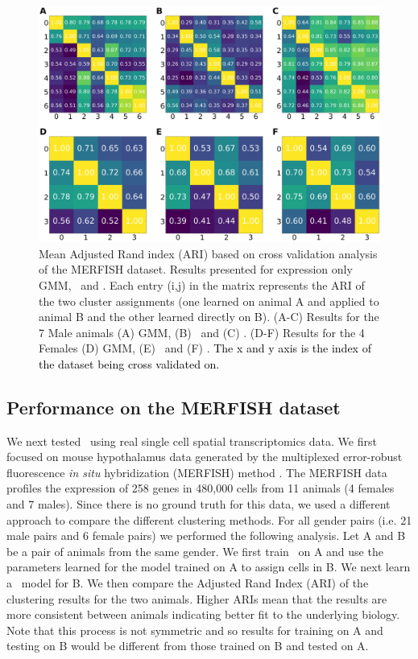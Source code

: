\begin{figure}[h]
    \includegraphics[width=\textwidth]{figs/cv.png}
    \caption{Mean Adjusted Rand index (ARI) based on cross validation analysis of the MERFISH dataset. Results presented for expression only GMM, \smfish\ and \fict. Each entry (i,j) in the matrix represents the ARI of the two cluster assignments (one learned on animal A and applied to animal B and the other learned directly on B). (A-C) Results for the 7 Male animals (A) GMM, (B) \smfish\ and (C) \fict. (D-F) Results for the 4 Females (D) GMM, (E) \smfish\ and (F) \fict. \textcolor{black}{The x and y axis is the index of the dataset being cross validated on.}}
    \label{fig:cv}
\end{figure}
\subsection{Performance on the MERFISH dataset}
We next tested \fict\ using real single cell spatial transcriptomics data. We first focused on mouse hypothalamus data generated by the multiplexed error-robust fluorescence \textit{in situ} hybridization (MERFISH) method \cite{moffitt2018molecular}. The MERFISH data profiles the expression of 258 genes in 480,000 cells from 11 animals (4 females and 7 males). 
Since there is no ground truth for this data, we used a different approach to compare the different clustering methods. For all gender pairs (i.e. 21 male pairs and 6 female pairs) we performed the following analysis. Let A and B be a pair of animals from the same gender. We first train \fict\ on A and use the parameters learned for the model trained on A to assign cells in B. We next learn a \fict\ model for B. We then compare the Adjusted Rand Index (ARI) of the clustering results for the two animals. Higher ARIs mean that the results are more consistent between animals indicating better fit to the underlying biology. Note that this process is not symmetric and so results for training on A and testing on B would be different from those trained on B and tested on A. 

